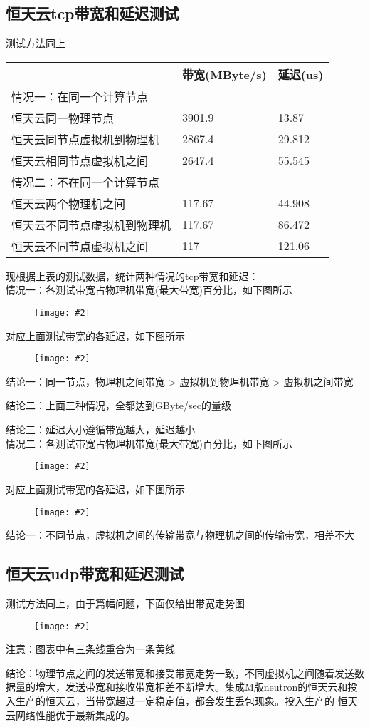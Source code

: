 \documentclass[a4paper,left=1.5cm,right=1.5cm,11pt]{article}
\newcommand{\sizedfic}[2]{\begin{figure}[H]
		\center
		\texttt{[image: \#2]}
	\end{figure}}
\begin{document}
\subsection{恒天云tcp带宽和延迟测试}
测试方法同上
\begin{center}
\begin{tabular}[c]{|l|l|l|}
\hline
 &  带宽(MByte/s)&延迟(us) \\
\hline
 情况一：在同一个计算节点 &  &\\
\hline
 恒天云同一物理节点 & 3901.9&13.87 \\
\hline
 恒天云同节点虚拟机到物理机& 2867.4&29.812 \\
\hline
 恒天云相同节点虚拟机之间& 2647.4&55.545 \\
 \hline
 \hline

 情况二：不在同一个计算节点&  &\\
 \hline
 恒天云两个物理机之间& 117.67&44.908 \\
 \hline
 恒天云不同节点虚拟机到物理机 & 117.67&86.472 \\
 \hline
 恒天云不同节点虚拟机之间& 117&121.06 \\
 \hline
\hline
\end{tabular}
\end{center}

现根据上表的测试数据，统计两种情况的tcp带宽和延迟：\\
情况一：各测试带宽占物理机带宽(最大带宽)百分比，如下图所示\\
\sizedfic{0.6}{tcp_bw_11.png}
对应上面测试带宽的各延迟，如下图所示\\
\sizedfic{0.6}{tcp_lat_11.png}
结论一：同一节点，物理机之间带宽 > 虚拟机到物理机带宽 > 虚拟机之间带宽\par
结论二：上面三种情况，全都达到GByte/sec的量级\par
结论三：延迟大小遵循带宽越大，延迟越小\\
情况二：各测试带宽占物理机带宽(最大带宽)百分比，如下图所示\\
\sizedfic{0.6}{tcp_bw_22.png}
对应上面测试带宽的各延迟，如下图所示\\
\sizedfic{0.6}{tcp_lat_22.png}
结论一：不同节点，虚拟机之间的传输带宽与物理机之间的传输带宽，相差不大

\subsection{恒天云udp带宽和延迟测试}
测试方法同上，由于篇幅问题，下面仅给出带宽走势图
\sizedfic{0.9}{udp3.png}
注意：图表中有三条线重合为一条黄线\par
结论：物理节点之间的发送带宽和接受带宽走势一致，不同虚拟机之间随着发送数据量的增大，发送带宽和接收带宽相差不断增大。集成M版neutron的恒天云和投入生产的恒天云，当带宽超过一定稳定值，都会发生丢包现象。投入生产的
恒天云网络性能优于最新集成的。
\end{document}
